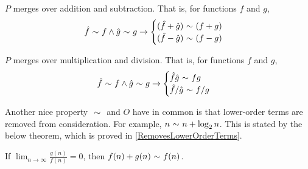 \begin{theorem}
	$P$ merges over addition and subtraction. That is, for functions $f$ and $g$,
	\begin{align*}
	\hat{f} \ \mathtt{\sim}\  f \land \hat{g} \ \mathtt{\sim}\  g \rightarrow \begin{cases}
		(\hat{f} + \hat{g}) \ \mathtt{\sim}\  (f + g)\\
		(\hat{f} - \hat{g}) \ \mathtt{\sim}\  (f - g)
	\end{cases}
	\end{align*}
\end{theorem}

\begin{theorem}
	$P$ merges over multiplication and division. That is, for functions $f$ and $g$,
	\begin{align*}
	\hat{f} \ \mathtt{\sim}\  f \land \hat{g} \ \mathtt{\sim}\  g \rightarrow \begin{cases}
	\hat{f}\hat{g} \ \mathtt{\sim}\  fg\\
	\hat{f} / \hat{g} \ \mathtt{\sim}\  f / g
	\end{cases}
	\end{align*}
\end{theorem}

Another nice property $\ \mathtt{\sim}\ $ and $O$ have in common is that lower-order terms are removed from consideration. For example, $n \ \mathtt{\sim}\  n + \log_2 n$. This is stated by the below theorem, which is proved in \ref{RemovesLowerOrderTerms}.

\begin{theorem}
	If $\lim_{n \to \infty} \frac{g(n)}{f(n)} = 0$, then $f(n) + g(n) \ \mathtt{\sim}\  f(n)$.
\end{theorem}